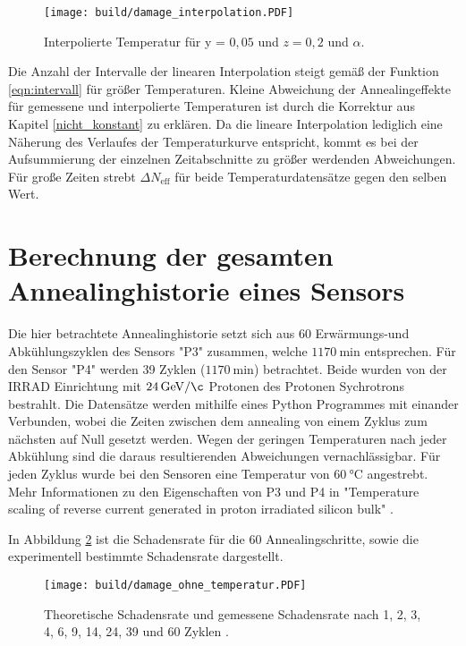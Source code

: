 \begin{figure}
    \texttt{[image: build/damage\_interpolation.PDF]}
\caption{Interpolierte Temperatur für y = $0,05$ und $z=0,2$ und $\alpha$.}
\label{fig:interpolation_damage}
\end{figure}

Die Anzahl der Intervalle der linearen Interpolation steigt gemäß der Funktion \ref{eqn:intervall}
für größer Temperaturen. Kleine Abweichung der Annealingeffekte für gemessene und
interpolierte Temperaturen ist durch die Korrektur aus Kapitel \ref{nicht_konstant}
zu erklären. Da die lineare Interpolation lediglich eine Näherung des Verlaufes der
Temperaturkurve entspricht, kommt es bei der Aufsummierung der einzelnen Zeitabschnitte
zu größer werdenden Abweichungen. Für große Zeiten strebt $\Delta N_{\mathrm{eff}}$
für beide Temperaturdatensätze gegen den selben Wert.

\section{Berechnung der gesamten Annealinghistorie eines Sensors}
Die hier betrachtete Annealinghistorie setzt sich aus 60 Erwärmungs-und
Abkühlungszyklen des Sensors "P3" zusammen, welche $\SI{1170}{\minute}$ entsprechen.
Für den Sensor "P4" werden 39 Zyklen ($\SI{1170}{\minute}$) betrachtet.
Beide wurden von der IRRAD Einrichtung mit $\SI{24}{\giga\eV\per\c}$ Protonen des Protonen Sychrotrons bestrahlt.
Die Datensätze werden mithilfe eines Python Programmes mit einander Verbunden,
wobei die Zeiten zwischen dem annealing von einem Zyklus zum nächsten auf Null gesetzt werden. Wegen der geringen
Temperaturen nach jeder Abkühlung sind die daraus resultierenden Abweichungen vernachlässigbar.
Für jeden Zyklus wurde bei den Sensoren eine Temperatur von $\SI{60}{\celsius}$ angestrebt.
Mehr Informationen zu den Eigenschaften von P3 und P4 in "Temperature scaling of reverse current generated in
proton irradiated silicon bulk" \cite{felix}.


In Abbildung \ref{fig:P_3} ist die Schadensrate für die 60 Annealingschritte,
sowie die experimentell bestimmte Schadensrate dargestellt.

\begin{figure}
    \texttt{[image: build/damage\_ohne\_temperatur.PDF]}
\caption{Theoretische Schadensrate und gemessene Schadensrate nach 1, 2, 3, 4, 6, 9, 14, 24, 39 und 60 Zyklen .}
\label{fig:P_3}
\end{figure}

